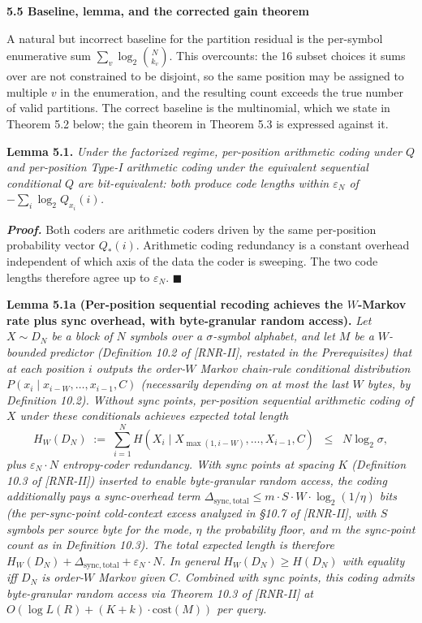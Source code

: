 \documentclass[
]{article}
\begin{document}
\textbf{5.5 Baseline, lemma, and the corrected gain theorem}

A natural but incorrect baseline for the partition residual is the
per-symbol enumerative sum $\sum_v \log_2 \binom{N}{k_v}$. This
overcounts: the 16 subset choices it sums over are not constrained to
be disjoint, so the same position may be assigned to multiple $v$ in
the enumeration, and the resulting count exceeds the true number of
valid partitions. The correct baseline is the multinomial, which we
state in Theorem 5.2 below; the gain theorem in Theorem 5.3 is
expressed against it.

\textbf{Lemma 5.1.} \emph{Under the factorized regime, per-position
arithmetic coding under $Q$ and per-position Type-I arithmetic coding
under the equivalent sequential conditional $Q$ are bit-equivalent:
both produce code lengths within $\varepsilon_N$ of
$-\sum_i \log_2 Q_{x_i}(i)$.}

\emph{\textbf{Proof.}} Both coders are arithmetic coders driven by the
same per-position probability vector $Q_*(i)$. Arithmetic coding
redundancy is a constant overhead independent of which axis of the
data the coder is sweeping. The two code lengths therefore agree up to
$\varepsilon_N$. \hfill$\blacksquare$

\textbf{Lemma 5.1a (Per-position sequential recoding achieves the
$W$-Markov rate plus sync overhead, with byte-granular random
access).} \emph{Let $X \sim D_N$ be a block of $N$ symbols over a
$\sigma$-symbol alphabet, and let $M$ be a $W$-bounded predictor
(Definition 10.2 of [RNR-II], restated in the Prerequisites) that at each position $i$ outputs the order-$W$
Markov chain-rule conditional distribution
$P(x_i \mid x_{i-W}, \dots, x_{i-1}, C)$ (necessarily depending on
at most the last $W$ bytes, by Definition 10.2). Without sync
points, per-position sequential arithmetic coding of $X$ under
these conditionals achieves expected total length}
\[
H_W(D_N) \;:=\; \sum_{i=1}^N H(X_i \mid X_{\max(1, i-W)}, \dots, X_{i-1}, C)
\;\;\leq\;\; N \log_2 \sigma,
\]
\emph{plus $\varepsilon_N \cdot N$ entropy-coder redundancy. With
sync points at spacing $K$ (Definition 10.3 of [RNR-II]) inserted to enable
byte-granular random access, the coding additionally pays a
sync-overhead term $\Delta_{\mathrm{sync, total}} \leq m \cdot S
\cdot W \cdot \log_2(1/\eta)$ bits (the per-sync-point cold-context
excess analyzed in §10.7 of [RNR-II], with $S$ symbols per source byte for the
mode, $\eta$ the probability floor, and $m$ the sync-point count
as in Definition 10.3). The total expected length is therefore
$H_W(D_N) + \Delta_{\mathrm{sync, total}} + \varepsilon_N \cdot N$.
In general $H_W(D_N) \geq H(D_N)$ with equality iff $D_N$ is
order-$W$ Markov given $C$. Combined with sync points, this coding
admits byte-granular random access via Theorem 10.3 of [RNR-II] at
$O(\log L(R) + (K+k) \cdot \mathrm{cost}(M))$ per query.}
\end{document}
